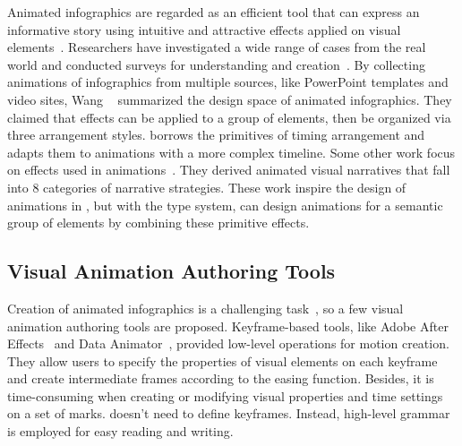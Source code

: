 Animated infographics are regarded as an efficient tool that can express an informative story using intuitive and attractive effects applied on visual elements~\cite{blazer2019animated, brehmer2016timelines}.
Researchers have investigated a wide range of cases from the real world and conducted surveys for understanding and creation~\cite{wang2021animated, shi2021communicating}. 
By collecting animations of infographics from multiple sources, like PowerPoint templates and video sites, Wang \etal~\cite{wang2021animated} summarized the design space of animated infographics. 
They claimed that effects can be applied to a group of elements, then be organized via three arrangement styles.
\gaia{} borrows the primitives of timing arrangement and adapts them to animations with a more complex timeline.
Some other work focus on effects used in animations~\cite{shi2021communicating}.
They derived animated visual narratives that fall into 8 categories of narrative strategies. 
These work inspire the design of animations in \gaia{}, but with the type system, \gaia{} can design animations for a semantic group of elements by combining these primitive effects.

\subsection{Visual Animation Authoring Tools}

Creation of animated infographics is a challenging task~\cite{jahanlou2022katika, howlong}, so a few visual animation authoring tools are proposed.
Keyframe-based tools, like Adobe After Effects~\cite{AdobeAE} and Data Animator~\cite{thompson2021data}, provided low-level operations for motion creation.
They allow users to specify the properties of visual elements on each keyframe and create intermediate frames according to the easing function.
Besides, it is time-consuming when creating or modifying visual properties and time settings on a set of marks.
\gaia{} doesn't need to define keyframes. Instead, high-level grammar is employed for easy reading and writing.

